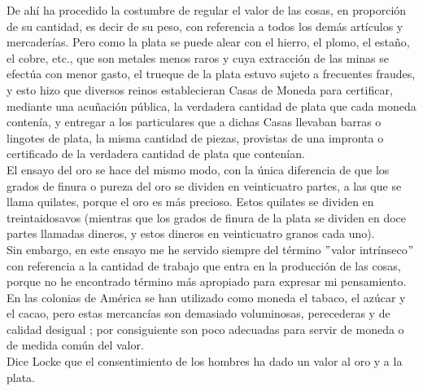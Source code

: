 \documentclass[10pt]{article}
\begin{document}
\begin{multicols}{1}
De ahí ha procedido la costumbre de regular el valor de las cosas, en proporción de su cantidad, es decir de su peso, con referencia a todos los demás artículos y mercaderías. Pero como la plata se puede alear con el hierro, el plomo, el estaño, el cobre, etc., que son metales menos raros y cuya extracción de las minas se efectúa con menor gasto, el trueque de la plata estuvo sujeto a frecuentes fraudes, y esto hizo que diversos reinos establecieran Casas de Moneda para certificar, mediante una acuñación pública, la verdadera cantidad de plata que cada moneda contenía, y entregar a los particulares que a dichas Casas llevaban barras o lingotes de plata, la misma cantidad de piezas, provistas de una impronta o certificado de la verdadera cantidad de plata que contenían.\\
El ensayo del oro se hace del mismo modo, con la única diferencia de que los grados de finura o pureza del oro se dividen en veinticuatro partes, a las que se llama quilates, porque el oro es más precioso. Estos quilates se dividen en treintaidosavos (mientras que los grados de finura de la plata se dividen en doce partes llamadas dineros, y estos dineros en veinticuatro granos cada uno).\\
Sin embargo, en este ensayo me he servido siempre del término $"$valor intrínseco$"$ con referencia a la cantidad de trabajo que entra en la producción de las cosas, porque no he encontrado término más apropiado para expresar mi pensamiento.\\
En las colonias de América se han utilizado como moneda el tabaco, el azúcar y el cacao, pero estas mercancías son demasiado voluminosas, perecederas y de calidad desigual ; por consiguiente son poco adecuadas para servir de moneda o de medida común del valor.\\
Dice Locke que el consentimiento de los hombres ha dado un valor al oro y a la plata.
\end{multicols}
\end{document}
